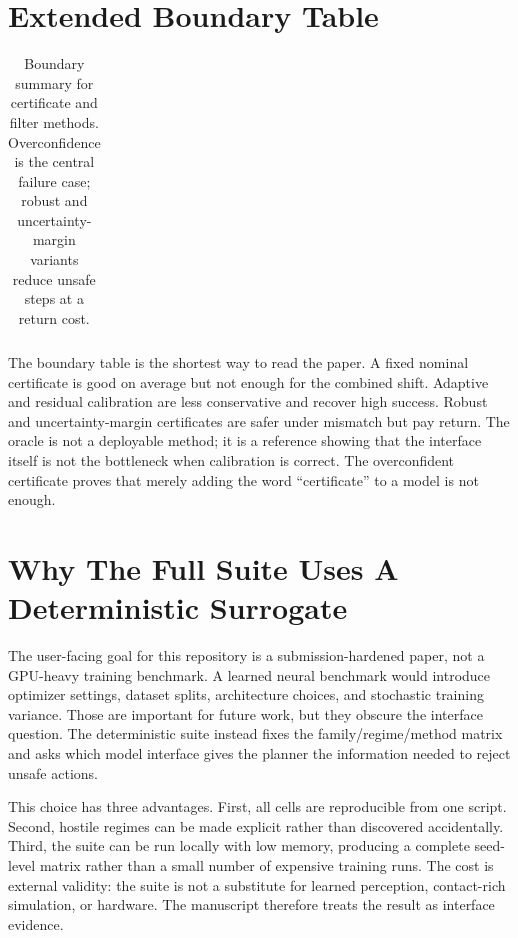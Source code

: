 \documentclass{article}
\begin{document}
\section{Extended Boundary Table}

\begin{table}[h]
\centering
\small
\caption{Boundary summary for certificate and filter methods. Overconfidence is the central failure case; robust and uncertainty-margin variants reduce unsafe steps at a return cost.}
\label{tab:boundary}
\begin{tabular}{lrrr}
\toprule

\end{tabular}
\end{table}

The boundary table is the shortest way to read the paper. A fixed nominal certificate is good on average but not enough for the combined shift. Adaptive and residual calibration are less conservative and recover high success. Robust and uncertainty-margin certificates are safer under mismatch but pay return. The oracle is not a deployable method; it is a reference showing that the interface itself is not the bottleneck when calibration is correct. The overconfident certificate proves that merely adding the word ``certificate'' to a model is not enough.

\section{Why The Full Suite Uses A Deterministic Surrogate}

The user-facing goal for this repository is a submission-hardened paper, not a GPU-heavy training benchmark. A learned neural benchmark would introduce optimizer settings, dataset splits, architecture choices, and stochastic training variance. Those are important for future work, but they obscure the interface question. The deterministic suite instead fixes the family/regime/method matrix and asks which model interface gives the planner the information needed to reject unsafe actions.

This choice has three advantages. First, all cells are reproducible from one script. Second, hostile regimes can be made explicit rather than discovered accidentally. Third, the suite can be run locally with low memory, producing a complete seed-level matrix rather than a small number of expensive training runs. The cost is external validity: the suite is not a substitute for learned perception, contact-rich simulation, or hardware. The manuscript therefore treats the result as interface evidence.
\end{document}
